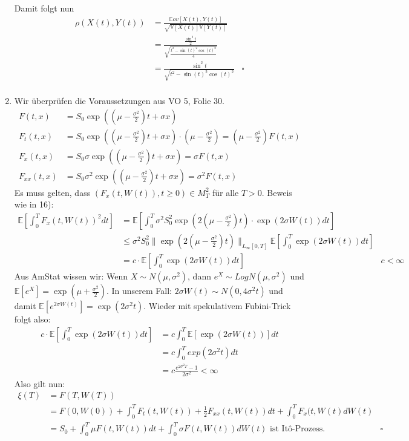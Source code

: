 \documentclass[a4paper,11pt,notitlepage,fullpage]{article}
\newcommand{\Ee}[1]{\mathbb E\left[#1\right]}
\newcommand{\Vv}[1]{\mathbb V\left[#1\right]}
\newcommand{\Cov}[1]{\mathbb Cov\left[#1\right]}
\begin{document}
\begin{enumerate}
Damit folgt nun
\begin{align*}
\rho(X(t), Y(t)) &= \frac{\Cov{X(t), Y(t)}}{\sqrt{\Vv{X(t)}\Vv{Y(t)}}} \\
&= \frac{\frac{\sin^2t}{2}}{\sqrt{ \frac{t^2 - \sin(t)^2\cos(t)^2}{4} }} \\
&= \frac{\sin^2t}{\sqrt{ t^2 - \sin(t)^2\cos(t)^2}}  &\square\\
\end{align*}

\item Wir überprüfen die Voraussetzungen aus VO 5, Folie 30.
\begin{align*}
F(t, x) &= S_0 \exp\left(\left(\mu - \frac{\sigma^2}{2}\right)t + \sigma x\right) \\
F_t(t, x) &= S_0 \exp\left(\left(\mu - \frac{\sigma^2}{2}\right)t + \sigma x\right) \cdot \left(\mu - \frac{\sigma^2}{2}\right) = \left(\mu - \frac{\sigma^2}{2}\right) F(t, x)\\
F_x(t, x) &= S_0 \sigma \exp\left(\left(\mu - \frac{\sigma^2}{2}\right)t + \sigma x\right) = \sigma F(t, x) \\
F_{xx}(t, x) &= S_0 \sigma^2 \exp\left(\left(\mu - \frac{\sigma^2}{2}\right)t + \sigma x\right) = \sigma^2 F(t, x)
\end{align*}
Es muss gelten, dass $(F_x(t, W(t)), t \geq 0) \in M_T^2$ für alle $T > 0$. Beweis wie in 16):
\begin{align*}
\Ee{\int_0^T F_x(t, W(t))^2 dt} &= \Ee{\int_0^T \sigma^2 S_0^2 \exp(2(\mu - \frac{\sigma^2}{2}) t) \cdot \exp(2\sigma W(t)) dt} \\
&\leq  \sigma^2 S_0^2 \|\exp(2(\mu - \frac{\sigma^2}{2}) t)\|_{L_\infty[0, T]} \Ee{\int _0^T \exp(2\sigma W(t)) dt} \\
&= c \cdot \Ee{\int _0^T \exp(2\sigma W(t)) dt} &c < \infty
\end{align*}
Aus AmStat wissen wir: Wenn $X\sim N(\mu, \sigma^2)$, dann $e^X \sim LogN(\mu, \sigma^2)$ und $\Ee{e^X} = \exp(\mu + \frac{\sigma^2}{2})$. In unserem Fall: $2\sigma W(t) \sim N(0, 4\sigma^2 t)$ und damit $\Ee{e^{2\sigma W(t)}} =  \exp(2\sigma^2 t)$. Wieder mit spekulativem Fubini-Trick folgt also:
\begin{align*}
c \cdot \Ee{\int _0^T \exp(2\sigma W(t)) dt} &= c \int _0^T \Ee{\exp(2\sigma W(t))} dt \\
&= c \int _0^T exp(2\sigma^2 t) dt \\
&= c \frac{e^{2\sigma^2 T}-1}{2\sigma^2} < \infty
\end{align*}
Also gilt nun:
\begin{align*}
\xi(T) &= F(T, W(T)) \\
&= F(0, W(0)) + \int_0^T F_t(t, W(t)) + \frac{1}{2} F_{xx}(t, W(t)) dt + \int_0^T F_x(t, W(t) dW(t) \\
&= S_0 + \int_0^T \mu F(t, W(t)) dt + \int_0^T \sigma F(t, W(t)) dW(t) \text{ ist Itô-Prozess.}&\square
\end{align*}


\end{enumerate}
\end{document}
